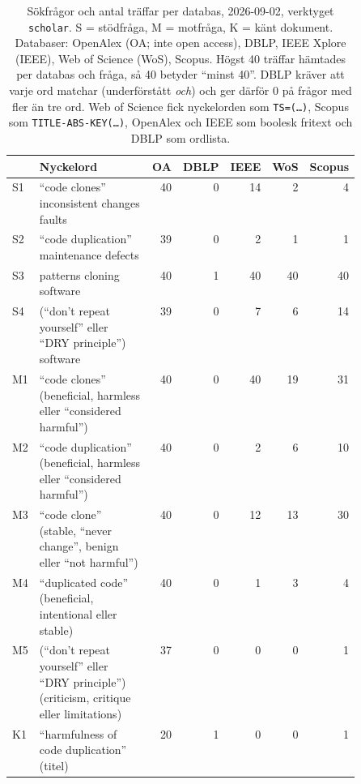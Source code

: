 \begin{table}[b]
  \centering
  \caption{Sökfrågor och antal träffar per databas, 2026-09-02,
    verktyget \texttt{scholar}.  S = stödfråga, M = motfråga, K = känt
    dokument.  Databaser: OpenAlex (OA; inte
    \foreignlanguage{english}{open access}), DBLP, IEEE Xplore (IEEE),
    Web of Science (WoS), Scopus.  Högst 40 träffar hämtades per databas
    och fråga, så 40 betyder \enquote{minst 40}.  DBLP kräver att varje
    ord matchar (underförstått \emph{och}) och ger därför 0 på frågor med
    fler än tre ord.  Web of Science fick nyckelorden som
    \texttt{TS=(\dots)}, Scopus som \texttt{TITLE-ABS-KEY(\dots)},
    OpenAlex och IEEE som boolesk fritext och DBLP som
    ordlista.}
  \label{tab:dry-queries}
  \footnotesize
  \begin{tabular}{@{}lp{0.5\linewidth}rrrrr@{}}
    \toprule
    & Nyckelord & OA & DBLP & IEEE & WoS & Scopus \\
    \midrule
    S1 & \enquote{code clones} inconsistent changes faults
       & 40 & 0 & 14 & 2 & 4 \\
    S2 & \enquote{code duplication} maintenance defects
       & 39 & 0 & 2 & 1 & 1 \\
    S3 & patterns cloning software
       & 40 & 1 & 40 & 40 & 40 \\
    S4 & (\enquote{don't repeat yourself} eller \enquote{DRY principle})
         software
       & 39 & 0 & 7 & 6 & 14 \\
    \midrule
    M1 & \enquote{code clones} (beneficial, harmless eller
         \enquote{considered harmful})
       & 40 & 0 & 40 & 19 & 31 \\
    M2 & \enquote{code duplication} (beneficial, harmless eller
         \enquote{considered harmful})
       & 40 & 0 & 2 & 6 & 10 \\
    M3 & \enquote{code clone} (stable, \enquote{never change}, benign
         eller \enquote{not harmful})
       & 40 & 0 & 12 & 13 & 30 \\
    M4 & \enquote{duplicated code} (beneficial, intentional eller stable)
       & 40 & 0 & 1 & 3 & 4 \\
    M5 & (\enquote{don't repeat yourself} eller \enquote{DRY principle})
         (criticism, critique eller limitations)
       & 37 & 0 & 0 & 0 & 1 \\
    \midrule
    K1 & \enquote{harmfulness of code duplication} (titel)
       & 20 & 1 & 0 & 0 & 1 \\
    \bottomrule
  \end{tabular}
\end{table}

